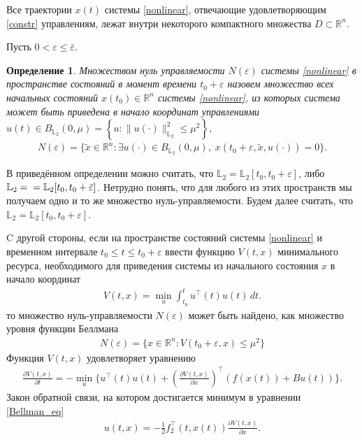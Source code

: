 \documentclass[12pt,a4paper,twoside]{article}  %
\newtheorem{df}{Определение}
\begin{document}
		Все траектории $ x(t) $ системы \eqref{nonlinear}, отвечающие удовлетворяющим \eqref{constr} управлениям,  лежат внутри некоторого компактного множества $ D \subset \mathbb{R}^n $.
		
		Пусть $ 0 <  \varepsilon \leqslant \bar{\varepsilon} $.
		\begin{df}
			{\it Множеством нуль управляемости} $ N(\varepsilon) $ системы \eqref{nonlinear} в пространстве состояний в момент времени $ t_0 + \varepsilon $ назовем
			множество всех начальных состояний $ x(t_0) \in \mathbb{R}^n $ системы \eqref{nonlinear},  из которых система может быть приведена в начало координат управлениями
			$ u(t) \in B_{\mathbb{L}_2}(0,\mu)  =\left\lbrace u:\lVert u(\cdot)\rVert^2_{\mathbb{L}_2} \leqslant \mu^2\right\rbrace  $,
			\begin{gather*}
				N(\varepsilon)=\{\widetilde{x}\in \mathbb{R}^n:\exists u(\cdot)\in B_{\mathbb{L}_2}(0,\mu),\; x(t_0 + \varepsilon,\widetilde{x},u(\cdot)) = 0\}.
			\end{gather*}
		\end{df}
		
		В приведённом определении можно считать, что $ \mathbb{L}_2 =\mathbb{L}_2[t_0,t_0+\varepsilon] $, либо  $ \mathbb{L}_2 =\\=\mathbb{L}_2[t_0,t_0+\bar{\varepsilon}] $. Нетрудно понять, что для любого из этих пространств мы получаем одно и то же множество нуль-управляемости. Будем далее считать, что $ \mathbb{L}_2 =\mathbb{L}_2[t_0,t_0+\varepsilon] $.
		
		C другой стороны, если на пространстве состояний системы \eqref{nonlinear} и временном интервале $ t_0 \leqslant t \leqslant t_0 + \varepsilon $ ввести функцию $ V(t,x) $ минимального ресурса, необходимого для приведения системы из начального состояния $x$ в начало координат
		\begin{gather}\label{Bellman_fun}
			V(t,x) = \min\limits_{u} \int_{t_0}^{t} u^{\top}(t) u(t) \, dt.
		\end{gather}
		то множество нуль-управляемости $ N(\varepsilon) $ может быть найдено, как множество уровня функции Беллмана
		\begin{gather}\label{Null_set}
			N(\varepsilon)  = \{x \in \mathbb{R}^n: V(t_0 + \varepsilon,x) \leqslant \mu^2\}
		\end{gather}
		Функция $V(t,x)$  удовлетворяет уравнению
		\begin{gather}\label{Bellman_eq}
			\frac{\partial V(t,x)}{\partial t} = -\min\limits_{u} \{u^{\top}(t) u(t) + \left(\frac{\partial V(t,x)}{\partial x}\right)^{\top} \left(f(x(t))+B u(t)\right) \}.
		\end{gather}
		Закон обратной связи, на котором достигается минимум в уравнении \eqref{Bellman_eq}
		\begin{gather}\label{feedback}
			u(t,x) = -\frac{1}{2} f_2^{\top}(t,x(t))\frac{\partial V(t,x)}{\partial x}.
		\end{gather}
		
\end{document}
